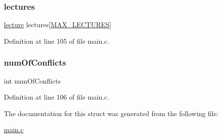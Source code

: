 \subsubsection{\texorpdfstring{lectures}{lectures}}
{\footnotesize\ttfamily \hyperlink{structlecture}{lecture} lectures\mbox{[}\hyperlink{main_8c_a152499a7a91751df0c7f203a60a88003}{M\+A\+X\+\_\+\+L\+E\+C\+T\+U\+R\+ES}\mbox{]}}



Definition at line 105 of file main.\+c.

\hypertarget{structtimetable_a6b5984c472886301ccaf88155193b2fa}{}\label{structtimetable_a6b5984c472886301ccaf88155193b2fa} 
\subsubsection{\texorpdfstring{num\+Of\+Conflicts}{numOfConflicts}}
{\footnotesize\ttfamily int num\+Of\+Conflicts}



Definition at line 106 of file main.\+c.



The documentation for this struct was generated from the following file\+:\begin{DoxyCompactItemize}
\item 
\hyperlink{main_8c}{main.\+c}\end{DoxyCompactItemize}
